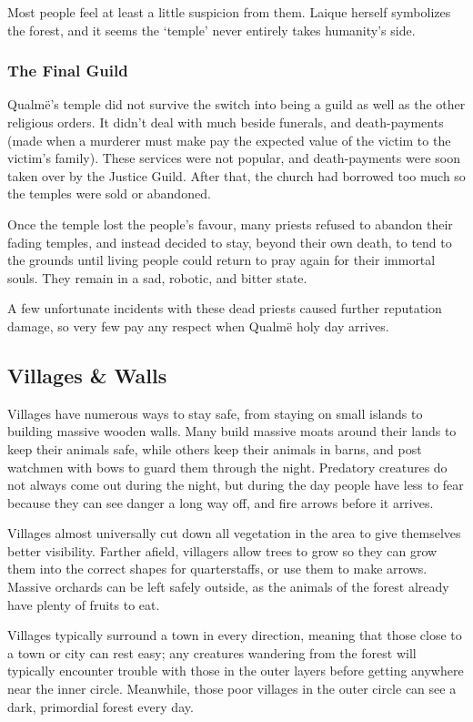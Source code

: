 \begin{multicols}{2}
Most people feel at least a little suspicion from them.
Laique herself symbolizes the forest, and it seems the `temple' never entirely takes humanity's side.

\subsubsection{The Final Guild}

Qualm\"{e}'s temple did not survive the switch into being a guild as well as the other religious orders.
It didn't deal with much beside funerals, and death-payments (made when a murderer must make pay the expected value of the victim to the victim's family).
These services were not popular, and death-payments were soon taken over by the Justice Guild.
After that, the church had borrowed too much so the temples were sold or abandoned.

Once the temple lost the people's favour, many priests refused to abandon their fading temples, and instead decided to stay, beyond their own death, to tend to the grounds until living people could return to pray again for their immortal souls.
They remain in a sad, robotic, and bitter state.

A few unfortunate incidents with these dead priests caused further reputation damage, so very few pay any respect when Qualm\"e holy day arrives.

\subsection{Villages \& Walls}

Villages have numerous ways to stay safe, from staying on small islands to building massive wooden walls.
Many build massive moats around their lands to keep their animals safe, while others keep their animals in barns, and post watchmen with bows to guard them through the night.
Predatory creatures do not always come out during the night, but during the day people have less to fear because they can see danger a long way off, and fire arrows before it arrives.

Villages almost universally cut down all vegetation in the area to give themselves better visibility.
Farther afield, villagers allow trees to grow so they can grow them into the correct shapes for quarterstaffs, or use them to make arrows.
Massive orchards can be left safely outside, as the animals of the forest already have plenty of fruits to eat.

Villages typically surround a town in every direction, meaning that those close to a town or city can rest easy;
any creatures wandering from the forest will typically encounter trouble with those in the outer layers before getting anywhere near the inner circle.
Meanwhile, those poor villages in the outer circle can see a dark, primordial forest every day.


\end{multicols}
